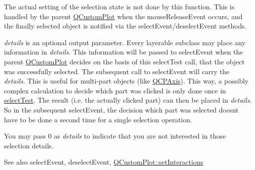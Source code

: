 The actual setting of the selection state is not done by this function. This is handled by the parent \hyperlink{classQCustomPlot}{Q\+Custom\+Plot} when the mouse\+Release\+Event occurs, and the finally selected object is notified via the select\+Event/deselect\+Event methods.

{\itshape details} is an optional output parameter. Every layerable subclass may place any information in {\itshape details}. This information will be passed to select\+Event when the parent \hyperlink{classQCustomPlot}{Q\+Custom\+Plot} decides on the basis of this select\+Test call, that the object was successfully selected. The subsequent call to select\+Event will carry the {\itshape details}. This is useful for multi-\/part objects (like \hyperlink{classQCPAxis}{Q\+C\+P\+Axis}). This way, a possibly complex calculation to decide which part was clicked is only done once in \hyperlink{classQCPLayerable_a4001c4d0dfec55598efa4d531f2179a9}{select\+Test}. The result (i.\+e. the actually clicked part) can then be placed in {\itshape details}. So in the subsequent select\+Event, the decision which part was selected doesn\textquotesingle{}t have to be done a second time for a single selection operation.

You may pass 0 as {\itshape details} to indicate that you are not interested in those selection details.

\begin{DoxySeeAlso}{See also}
select\+Event, deselect\+Event, \hyperlink{classQCustomPlot_a5ee1e2f6ae27419deca53e75907c27e5}{Q\+Custom\+Plot\+::set\+Interactions} 
\end{DoxySeeAlso}


